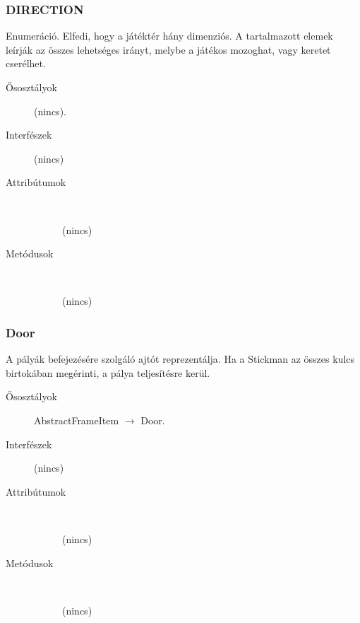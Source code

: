 		\subsubsection{DIRECTION}
				 Enumeráció. Elfedi, hogy a játéktér hány dimenziós.  A tartalmazott elemek leírják az összes lehetséges irányt,   melybe a játékos mozoghat, vagy keretet cserélhet.  			\begin{description}


				\item[Ősosztályok] (nincs).
				\item[Interfészek] (nincs)
				\item[Attribútumok]$\ $
					\begin{description}
						\item[] (nincs)
					\end{description}
				\item[Metódusok]$\ $
					\begin{description}
						\item[] (nincs)
					\end{description}
			\end{description}

		\subsubsection{Door}
				 A pályák befejezésére szolgáló ajtót reprezentálja.  Ha a Stickman az összes kulcs birtokában megérinti,  a pálya teljesítésre kerül. 			\begin{description}


				\item[Ősosztályok] AbstractFrameItem $\rightarrow{}$ Door.
				\item[Interfészek] (nincs)
				\item[Attribútumok]$\ $
					\begin{description}
						\item[] (nincs)
					\end{description}
				\item[Metódusok]$\ $
					\begin{description}
						\item[] (nincs)
					\end{description}
			\end{description}

